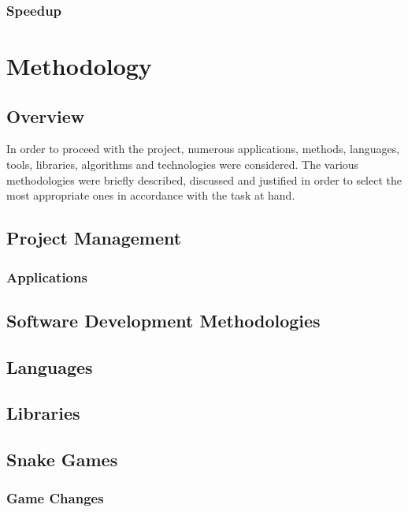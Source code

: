 \documentclass[
a4paper,
11pt,
english
]{report}
\begin{document}
\subsection{Speedup}


\chapter{Methodology}

\section{Overview}
In order to proceed with the project, numerous applications, methods, languages, tools, libraries, algorithms and technologies were considered. The various methodologies were briefly described, discussed and justified in order to select the most appropriate ones in accordance with the task at hand.

\section{Project Management}
\subsection{Applications}
\section{Software Development Methodologies}
\section{Languages}
\section{Libraries}
\section{Snake Games}
\subsection{Game Changes}
\end{document}
